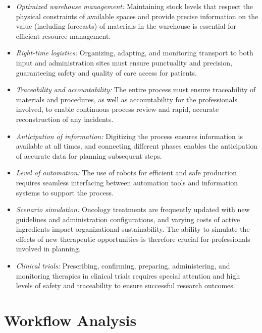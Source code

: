 \begin{itemize}
    \item \textit{Optimized warehouse management:} Maintaining stock levels that respect the physical constraints of available spaces and provide precise information on the value (including forecasts) of materials in the warehouse is essential for efficient resource management.
    
    \item \textit{Right-time logistics:} Organizing, adapting, and monitoring transport to both input and administration sites must ensure punctuality and precision, guaranteeing safety and quality of care access for patients.
    
    \item \textit{Traceability and accountability:} The entire process must ensure traceability of materials and procedures, as well as accountability for the professionals involved, to enable continuous process review and rapid, accurate reconstruction of any incidents.
    
    \item \textit{Anticipation of information:} Digitizing the process ensures information is available at all times, and connecting different phases enables the anticipation of accurate data for planning subsequent steps.
    
    \item \textit{Level of automation:} The use of robots for efficient and safe production requires seamless interfacing between automation tools and information systems to support the process.
    
    \item \textit{Scenario simulation:} Oncology treatments are frequently updated with new guidelines and administration configurations, and varying costs of active ingredients impact organizational sustainability. The ability to simulate the effects of new therapeutic opportunities is therefore crucial for professionals involved in planning.
    
    \item \textit{Clinical trials:} Prescribing, confirming, preparing, administering, and monitoring therapies in clinical trials requires special attention and high levels of safety and traceability to ensure successful research outcomes.
\end{itemize}


\section{Workflow Analysis}

